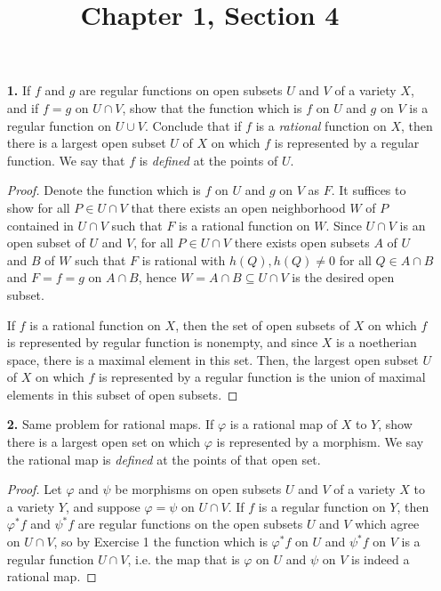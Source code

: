 \documentclass{article}
\title{Chapter 1, Section 4}
\begin{document}
\maketitle
\begin{enumerate} [label=\textbf{\arabic*.}, leftmargin=0cm]

\item[\textbf{1.}] If $f$ and $g$ are regular functions on open subsets $U$ and $V$ of a variety $X$, and if $f = g$ on $U \cap V$, show that the function which is $f$ on $U$ and $g$ on $V$ is a regular function on $U \cup V$. Conclude that if $f$ is a \textit{rational} function on $X$, then there is a largest open subset $U$ of $X$ on which $f$ is represented by a regular function. We say that $f$ is \textit{defined} at the points of $U$.

\begin{proof}
    Denote the function which is $f$ on $U$ and $g$ on $V$ as $F$. It suffices to show for all $P \in U \cap V$ that there exists an open neighborhood $W$ of $P$ contained in $U \cap V$ such that $F$ is a rational function on $W$. Since $U \cap V$ is an open subset of $U$ and $V$, for all $P \in U \cap V$ there exists open subsets $A$ of $U$ and $B$ of $W$ such that $F$ is rational with $h(Q), h(Q) \neq 0$ for all $Q \in A \cap B$ and $F = f = g$ on $A \cap B$, hence $W = A \cap B \subseteq U \cap V$ is the desired open subset.
    
    If $f$ is a rational function on $X$, then the set of open subsets of $X$ on which $f$ is represented by regular function is nonempty, and since $X$ is a noetherian space, there is a maximal element in this set. Then, the largest open subset $U$ of $X$ on which $f$ is represented by a regular function is the union of maximal elements in this subset of open subsets.
\end{proof}

\item[\textbf{2.}] Same problem for rational maps. If $\varphi$ is a rational map of $X$ to $Y$, show there is a largest open set on which $\varphi$ is represented by a morphism. We say the rational map is \textit{defined} at the points of that open set.

\begin{proof}
    Let $\varphi$ and $\psi$ be morphisms on open subsets $U$ and $V$ of a variety $X$ to a variety $Y$, and suppose $\varphi = \psi$ on $U \cap V$. If $f$ is a regular function on $Y$, then $\varphi^*f$ and $\psi^*f$ are regular functions on the open subsets $U$ and $V$ which agree on $U \cap V$, so by Exercise 1 the function which is $\varphi^*f$ on $U$ and $\psi^*f$ on $V$ is a regular function $U \cap V$, i.e. the map that is $\varphi$ on $U$ and $\psi$ on $V$ is indeed a rational map.


\end{proof}
\end{enumerate}
\end{document}
